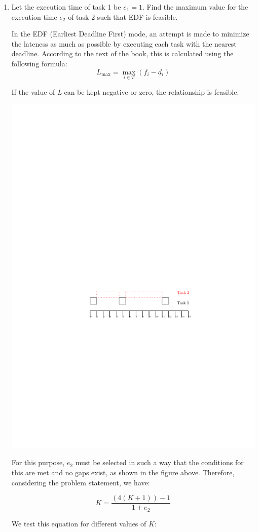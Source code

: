 \documentclass[12pt]{article}
\begin{document}
\begin{enumerate}
	\item 
	Let the execution time of task 1 be $e_1 = 1$. Find the maximum value for the
	execution time $e_2$ of task 2 such that EDF is feasible.
	\begin{qsolve}
		In the EDF (Earliest Deadline First) mode, an attempt is made to minimize the lateness as much as possible by executing each task with the nearest deadline. According to the text of the book, this is calculated using the following formula:
		$$ L_{\text{max}} = \max_{i \in T} (f_i - d_i) $$
		
		If the value of \textit{L} can be kept negative or zero, the relationship is feasible.
		\begin{center}
			\includegraphics*[width=0.7\linewidth]{images/Q2/a.pdf}
		\end{center}
		
		For this purpose, $e_2$ must be selected in such a way that the conditions for this are met and no gaps exist, as shown in the figure above. Therefore, considering the problem statement, we have:
		
		$$ K=\frac{(4(K+1))-1}{1+e_2} $$
		
		We test this equation for different values of $K$:
		

\end{qsolve}
\end{enumerate}
\end{document}
